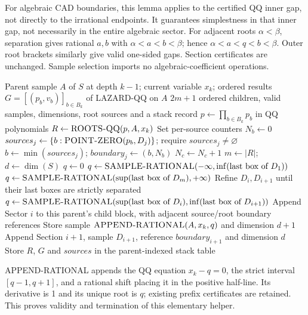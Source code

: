 \documentclass[11pt]{article}
\theoremstyle{definition}
\newcommand{\alg}[1]{\textsc{#1}}
\begin{document}
For algebraic CAD boundaries, this lemma applies to the certified QQ inner gap,
not directly to the irrational endpoints. It guarantees simplestness in that
inner gap, not necessarily in the entire algebraic sector. For adjacent roots
$\alpha<\beta$, separation gives rational $a,b$ with
$\alpha<a<b<\beta$; hence $\alpha<a<q<b<\beta$.
Outer root brackets similarly give valid one-sided gaps. Section certificates
are unchanged. Sample selection imports no algebraic-coefficient operations.

\begin{algorithm}[H]
\caption{LIFT-STACK: one parent and its complete children}\label{a:stack}
\begin{algorithmic}[1]
\Require Parent sample $A$ of $S$ at depth $k-1$; current variable $x_k$;
ordered results $G=[(p_b,v_b)]_{b\in B_k}$ of LAZARD-QQ on $A$
\Ensure $2m+1$ ordered children, valid samples, dimensions, root sources and a stack record
\State $p\gets\prod_{b\in B_k}p_b$ in QQ polynomials 
\State $R\gets\alg{ROOTS-QQ}(p,A,x_k)$ 
\State Set per-source counters $N_b\gets0$
 \State $sources_j\gets\{b:\alg{POINT-ZERO}(p_b,D_j)\}$; require $sources_j\ne\varnothing$
 \State $b\gets\min(sources_j)$; $boundary_j\gets(b,N_b)$
  \State $N_c\gets N_c+1$ \EndFor
\EndFor
\State $m\gets|R|$; $d\gets\dim(S)$ 
  \State $q\gets0$
  \State $q\gets\alg{SAMPLE-RATIONAL}(-\infty,\inf(\text{last box of }D_1))$
  \State $q\gets\alg{SAMPLE-RATIONAL}(\sup(\text{last box of }D_m),+\infty)$
 \Else
  \State Refine $D_i,D_{i+1}$ until their last boxes are strictly separated
  \State $q\gets\alg{SAMPLE-RATIONAL}(\sup(\text{last box of }D_i),\inf(\text{last box of }D_{i+1}))$
 \EndIf
 \State Append Sector $i$ to this parent's child block, with adjacent source/root boundary references
 \State Store sample $\alg{APPEND-RATIONAL}(A,x_k,q)$ and dimension $d+1$
  \State Append Section $i+1$, sample $D_{i+1}$, reference $boundary_{i+1}$ and dimension $d$
 \EndIf
\EndFor
\State Store $R$, $G$ and $sources$ in the parent-indexed stack table
\end{algorithmic}
\end{algorithm}
APPEND-RATIONAL appends the QQ equation $x_k-q=0$, the strict interval
$[q-1,q+1]$, and a rational shift placing it in the positive half-line.
Its derivative is 1 and its unique root is $q$; existing prefix certificates are
retained. This proves validity and termination of this elementary helper.
\end{document}
